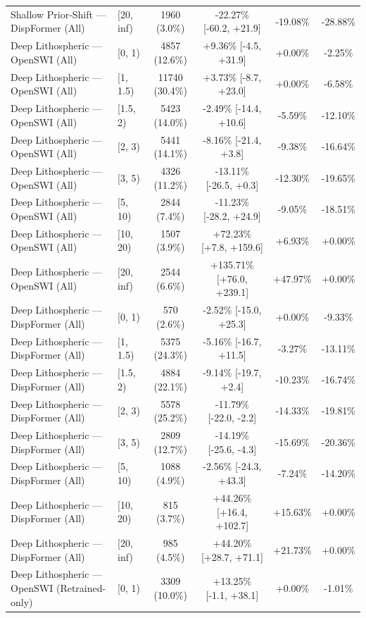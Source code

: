 \begin{table}[t]
\begin{tabular}{llcccc}
Shallow Prior-Shift — DispFormer (All) & [20, inf) & 1960 (3.0\%) & -22.27\% [-60.2, +21.9] & -19.08\% & -28.88\% \\
Deep Lithospheric — OpenSWI (All) & [0, 1) & 4857 (12.6\%) & +9.36\% [-4.5, +31.9] & +0.00\% & -2.25\% \\
Deep Lithospheric — OpenSWI (All) & [1, 1.5) & 11740 (30.4\%) & +3.73\% [-8.7, +23.0] & +0.00\% & -6.58\% \\
Deep Lithospheric — OpenSWI (All) & [1.5, 2) & 5423 (14.0\%) & -2.49\% [-14.4, +10.6] & -5.59\% & -12.10\% \\
Deep Lithospheric — OpenSWI (All) & [2, 3) & 5441 (14.1\%) & -8.16\% [-21.4, +3.8] & -9.38\% & -16.64\% \\
Deep Lithospheric — OpenSWI (All) & [3, 5) & 4326 (11.2\%) & -13.11\% [-26.5, +0.3] & -12.30\% & -19.65\% \\
Deep Lithospheric — OpenSWI (All) & [5, 10) & 2844 (7.4\%) & -11.23\% [-28.2, +24.9] & -9.05\% & -18.51\% \\
Deep Lithospheric — OpenSWI (All) & [10, 20) & 1507 (3.9\%) & +72.23\% [+7.8, +159.6] & +6.93\% & +0.00\% \\
Deep Lithospheric — OpenSWI (All) & [20, inf) & 2544 (6.6\%) & +135.71\% [+76.0, +239.1] & +47.97\% & +0.00\% \\
Deep Lithospheric — DispFormer (All) & [0, 1) & 570 (2.6\%) & -2.52\% [-15.0, +25.3] & +0.00\% & -9.33\% \\
Deep Lithospheric — DispFormer (All) & [1, 1.5) & 5375 (24.3\%) & -5.16\% [-16.7, +11.5] & -3.27\% & -13.11\% \\
Deep Lithospheric — DispFormer (All) & [1.5, 2) & 4884 (22.1\%) & -9.14\% [-19.7, +2.4] & -10.23\% & -16.74\% \\
Deep Lithospheric — DispFormer (All) & [2, 3) & 5578 (25.2\%) & -11.79\% [-22.0, -2.2] & -14.33\% & -19.81\% \\
Deep Lithospheric — DispFormer (All) & [3, 5) & 2809 (12.7\%) & -14.19\% [-25.6, -4.3] & -15.69\% & -20.36\% \\
Deep Lithospheric — DispFormer (All) & [5, 10) & 1088 (4.9\%) & -2.56\% [-24.3, +43.3] & -7.24\% & -14.20\% \\
Deep Lithospheric — DispFormer (All) & [10, 20) & 815 (3.7\%) & +44.26\% [+16.4, +102.7] & +15.63\% & +0.00\% \\
Deep Lithospheric — DispFormer (All) & [20, inf) & 985 (4.5\%) & +44.20\% [+28.7, +71.1] & +21.73\% & +0.00\% \\
Deep Lithospheric — OpenSWI (Retrained-only) & [0, 1) & 3309 (10.0\%) & +13.25\% [-1.1, +38.1] & +0.00\% & -1.01\% \\

\end{tabular}
\end{table}
